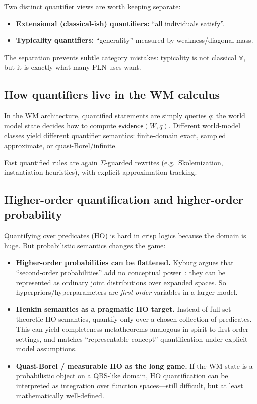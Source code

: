 \documentclass[11pt]{article}
\newcommand{\ev}{\mathsf{evidence}}
\begin{document}
Two distinct quantifier views are worth keeping separate:

\begin{itemize}[leftmargin=2em]
\item \textbf{Extensional (classical-ish) quantifiers:} ``all individuals satisfy''.
\item \textbf{Typicality quantifiers:} ``generality'' measured by weakness/diagonal mass.
\end{itemize}

The separation prevents subtle category mistakes: typicality is not classical $\forall$,
but it is exactly what many PLN uses want.

\subsection{How quantifiers live in the WM calculus}

In the WM architecture, quantified statements are simply queries $q$:
the world model state decides how to compute $\ev(W,q)$.
Different world-model classes yield different quantifier semantics:
finite-domain exact, sampled approximate, or quasi-Borel/infinite.

Fast quantified rules are again $\Sigma$-guarded rewrites (e.g.\ Skolemization,
instantiation heuristics), with explicit approximation tracking.

\subsection{Higher-order quantification and higher-order probability}

Quantifying over predicates (HO) is hard in crisp logics because the domain is huge.
But probabilistic semantics changes the game:

\begin{itemize}[leftmargin=2em]
\item \textbf{Higher-order probabilities can be flattened.}
Kyburg argues that ``second-order probabilities'' add no conceptual power~\cite{Kyburg}:
they can be represented as ordinary joint distributions over expanded spaces.
So hyperpriors/hyperparameters are \emph{first-order} variables in a larger model.
\item \textbf{Henkin semantics as a pragmatic HO target.}
Instead of full set-theoretic HO semantics, quantify only over a chosen collection of predicates.
This can yield completeness metatheorems analogous in spirit to first-order settings,
and matches ``representable concept'' quantification under explicit model assumptions.
\item \textbf{Quasi-Borel / measurable HO as the long game.}
If the WM state is a probabilistic object on a QBS-like domain, HO quantification can be interpreted
as integration over function spaces---still difficult, but at least mathematically well-defined.
\end{itemize}
\end{document}
